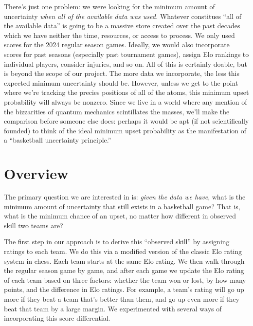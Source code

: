 \documentclass{article}
\begin{document}
There's just one problem: we were looking for the minimum amount of uncertainty \textit{when all of the available data was used.} Whatever constitues \enquote{all of the available data} is going to be a massive store created over the past decades which we have neither the time, resources, or access to process. We only used scores for the 2024 regular season games. Ideally, we would also incorporate scores for past seasons (especially past tournament games), assign Elo rankings to individual players, consider injuries, and so on. All of this is certainly doable, but is beyond the scope of our project. The more data we incorporate, the less this expected minimum uncertainty should be. However, unless we get to the point where we're tracking the precies positions of all of the atoms, this minimum upset probability will always be nonzero. Since we live in a world where any mention of the bizzarities of quantum mechanics scintillates the masses, we'll make the comparison before someone else does: perhaps it would be apt (if not scientifically founded) to think of the ideal minimum upset probability as the manifestation of a \enquote{basketball uncertainty principle.}

\newpage

\section{Overview}

The primary question we are interested in is: \textit{given the data we have}, what is the minimum amount of uncertainty that still exists in a basketball game? That is, what is the minimum chance of an upset, no matter how different in observed skill two teams are?

The first step in our approach is to derive this ``observed skill'' by assigning ratings to each team. We do this via a modified version of the classic Elo rating system in chess. Each team starts at the same Elo rating. We then walk through the regular season game by game, and after each game we update the Elo rating of each team based on three factors: whether the team won or lost, by how many points, and the difference in Elo ratings. For example, a team's rating will go up more if they beat a team that's better than them, and go up even more if they beat that team by a large margin. We experimented with several ways of incorporating this score differential.
\end{document}
